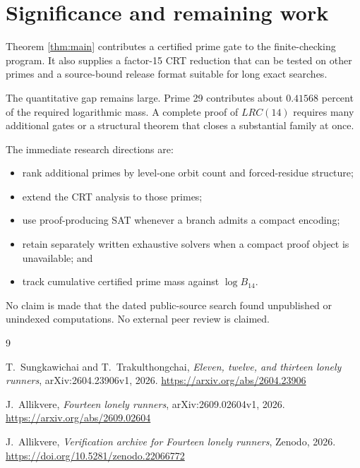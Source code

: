 \documentclass[11pt]{article}
\begin{document}
\section{Significance and remaining work}

Theorem \ref{thm:main} contributes a certified prime gate to the
finite-checking program.  It also supplies a factor-15 CRT reduction that can
be tested on other primes and a source-bound release format suitable for long
exact searches.

The quantitative gap remains large.  Prime 29 contributes about
\(0.41568\) percent of the required logarithmic mass.  A complete proof of
\(LRC(14)\) requires many additional gates or a structural theorem that
closes a substantial family at once.

The immediate research directions are:

\begin{itemize}[leftmargin=2em]
  \item rank additional primes by level-one orbit count and forced-residue
        structure;
  \item extend the CRT analysis to those primes;
  \item use proof-producing SAT whenever a branch admits a compact encoding;
  \item retain separately written exhaustive solvers when a compact proof
        object is unavailable; and
  \item track cumulative certified prime mass against \(\log B_{14}\).
\end{itemize}

No claim is made that the dated public-source search found unpublished or
unindexed computations.  No external peer review is claimed.

\begingroup
\raggedright
\begin{thebibliography}{9}

T.~Sungkawichai and T.~Trakulthongchai,
\emph{Eleven, twelve, and thirteen lonely runners},
arXiv:2604.23906v1, 2026.
\url{https://arxiv.org/abs/2604.23906}

J.~Allikvere,
\emph{Fourteen lonely runners},
arXiv:2609.02604v1, 2026.
\url{https://arxiv.org/abs/2609.02604}

J.~Allikvere,
\emph{Verification archive for Fourteen lonely runners},
Zenodo, 2026.
\url{https://doi.org/10.5281/zenodo.22066772}

\end{thebibliography}
\endgroup
\end{document}
